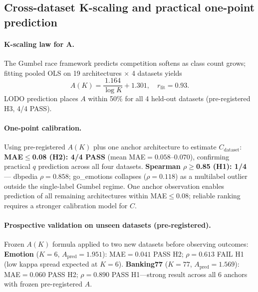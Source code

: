 \documentclass{article}
\begin{document}
\subsection{Cross-dataset K-scaling and practical one-point prediction}
\label{sec:kdataset}

\paragraph{K-scaling law for A.}
The Gumbel race framework predicts competition softens as class count grows; fitting pooled OLS on 19 architectures $\times$ 4 datasets yields
\begin{equation}
A(K) = \frac{1.164}{\log K} + 1.301,\quad r_\mathrm{fit}=0.93.
\label{eq:ak}
\end{equation}
LODO prediction places $A$ within 50\% for all 4 held-out datasets (pre-registered H3, 4/4 PASS).

\paragraph{One-point calibration.}
Using pre-registered $A(K)$ plus one anchor architecture to estimate $C_\mathrm{dataset}$:
\textbf{MAE$\leq$0.08 (H2): 4/4 PASS} (mean MAE$=0.058$--$0.070$), confirming practical $q$ prediction across all four datasets.
\textbf{Spearman $\rho\geq$0.85 (H1): 1/4} --- dbpedia $\rho=0.858$; go\_emotions collapses ($\rho=0.118$) as a multilabel outlier outside the single-label Gumbel regime.
One anchor observation enables prediction of all remaining architectures within MAE$\leq$0.08; reliable ranking requires a stronger calibration model for $C$.

\paragraph{Prospective validation on unseen datasets (pre-registered).}
Frozen $A(K)$ formula applied to two new datasets before observing outcomes:
\textbf{Emotion} ($K=6$, $A_\mathrm{pred}=1.951$): MAE$=0.041$ PASS H2; $\rho=0.613$ FAIL H1 (low kappa spread expected at $K=6$).
\textbf{Banking77} ($K=77$, $A_\mathrm{pred}=1.569$): MAE$=0.060$ PASS H2; $\rho=0.890$ PASS H1---strong result across all 6 anchors with frozen pre-registered $A$.
\end{document}

